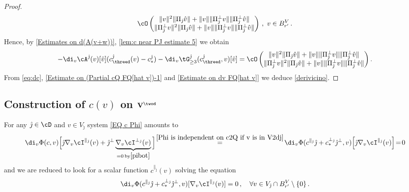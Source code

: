 \documentclass[11pt,a4paper,reqno]{article}
\numberwithin{equation}{section}
\theoremstyle{definition}
\begin{document}
\begin{proof}
\begin{equation}
        \cO \begin{pmatrix}             \|v\|^2\|\Pi_{\hat \jmath} \hat v\|+\|v\|\|\Pi_{\hat \jmath}^\bot v\|\|\Pi_{\hat \jmath}^\bot \hat v\|\\             \|\Pi_{\hat \jmath}^\bot v\|^2\|\Pi_{\hat \jmath} \hat v\|+\|v\|\|\Pi_{\hat \jmath}^\bot v\|\|\Pi_{\hat \jmath}^\bot \hat v\|         \end{pmatrix}\, , \ v\in B_{r'}^V \, . 
    \end{equation}  
    Hence, by \eqref{Estimates on d(A(v+w))}, \eqref{lem:c near PJ estimate 5} we obtain
    \begin{equation}\label{Estimate on dv FQ[hat v]}
        -\di_v \cA^{\hat \jmath}(v)[\hat v](c^{\hat \jmath}_{\threed}(v)-c_*^{\hat \jmath})-\di_v \tG^{\hat \jmath}_{\geq 3}(c^{\hat \jmath}_{\threed},v)[\hat v] = \cO \begin{pmatrix}             \|v\|^2\|\Pi_{\hat \jmath} \hat v\|+\|v\|\|\Pi_{\hat \jmath}^\bot v\|\|\Pi_{\hat \jmath}^\bot \hat v\|\\             \|\Pi_{\hat \jmath}^\bot v\|^2\|\Pi_{\hat \jmath} \hat v\|+\|v\|\|\Pi_{\hat \jmath}^\bot v\|\|\Pi_{\hat \jmath}^\bot \hat v\|         \end{pmatrix}.
    \end{equation}
    From \eqref{eq:dc}, \eqref{Estimate on (Partial cQ FQ[hat v])-1} and \eqref{Estimate on dv FQ[hat v]} we deduce \eqref{derivicino}.
    \end{proof}


    
\subsection{Construction  of $c(v)$ on $ {\bf V}^{\twod}$}\label{sec:speedcv}



For any  ${\hat \jmath} \in \cD$ 
and $ v \in V_{\hat \jmath} $ system \eqref{EQ c Phi} amounts to 
$$
\di_v \Phi (c, v) \Big[ \hat \jmath  
\nabla_v \cI^{\parallel_{\hat \jmath}} (v) + \hat \jmath^\bot  
\underbrace{\nabla_v \cI^{\bot_{\hat \jmath}}(v)}_{=0 \,  \text{by} \eqref{pibot}} \Big]  \!\stackrel{\eqref{Phi is independent on c2Q if v is in V2dj}} = \! 
\di_v \Phi (c^{\parallel_{\hat \jmath}}\hat \jmath+ c^{\bot_{\hat \jmath}}_*\hat \jmath^\bot, v) \Big[ \hat \jmath  
\nabla_v \cI^{\parallel_{\hat \jmath}} (v)  \Big] \! =\! 0  
$$
and we are reduced to look for a scalar  function 
$ c^{\parallel_{\hat \jmath}}(v) $ 
solving the equation 
\begin{equation}\label{eq:mf2d}
 \di_v\Phi(c^{\parallel_{\hat \jmath}}\hat \jmath +c^{\bot_{\hat \jmath}}_*\hat \jmath^\bot,v)[\nabla_v \cI^{\parallel_{\hat \jmath}}(v)] = 
 0 \, , \quad \forall v
 \in V_{\hat \jmath} \cap B_{r'}^V   
 \setminus \{0\} \, . 
\end{equation}
\end{document}
